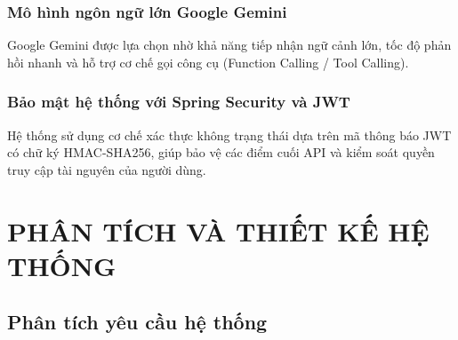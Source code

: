\documentclass[12pt,a4paper]{report}
\begin{document}
\subsection{Mô hình ngôn ngữ lớn Google Gemini}
Google Gemini được lựa chọn nhờ khả năng tiếp nhận ngữ cảnh lớn, tốc độ phản hồi nhanh và hỗ trợ cơ chế gọi công cụ (Function Calling / Tool Calling).

\subsection{Bảo mật hệ thống với Spring Security và JWT}
Hệ thống sử dụng cơ chế xác thực không trạng thái dựa trên mã thông báo JWT có chữ ký HMAC-SHA256, giúp bảo vệ các điểm cuối API và kiểm soát quyền truy cập tài nguyên của người dùng.

\chapter{PHÂN TÍCH VÀ THIẾT KẾ HỆ THỐNG}

\section{Phân tích yêu cầu hệ thống}
\end{document}
